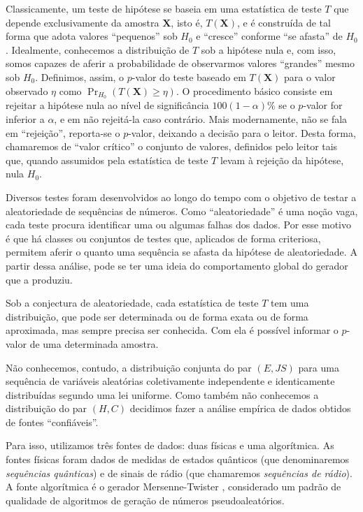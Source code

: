 Classicamente, um teste de hipótese se baseia em uma estatística de teste $T$ que depende exclusivamente da amostra $\bm X$, isto é, $T(\bm X)$, e é construída de tal forma que adota valores ``pequenos'' sob $H_0$ e ``cresce'' conforme ``se afasta'' de $H_0$.
Idealmente, conhecemos a distribuição de $T$ sob a hipótese nula e, com isso, somos capazes de aferir a probabilidade de observarmos valores ``grandes'' mesmo sob $H_0$.
Definimos, assim, o $p$-valor do teste baseado em $T(\bm X)$ para o valor observado $\eta$ como $\Pr_{H_0}(T(\bm X) \geq \eta)$.
O procedimento básico consiste em rejeitar a hipótese nula ao nível de significância $100(1-\alpha)\%$ se o $p$-valor for inferior a $\alpha$, e em não rejeitá-la caso contrário.
Mais modernamente, não se fala em ``rejeição'', reporta-se o $p$-valor, deixando a decisão para o leitor. Desta forma, chamaremos de ``valor crítico'' o conjunto de valores, definidos pelo leitor tais que, quando assumidos pela estatística de teste $T$ levam à rejeição da hipótese, nula $H_0$. 

Diversos testes foram desenvolvidos ao longo do tempo com o objetivo de testar a aleatoriedade de sequências de números.
Como ``aleatoriedade'' é uma noção vaga, cada teste procura identificar uma ou algumas falhas dos dados.
Por esse motivo é que há classes ou conjuntos de testes que, aplicados de forma criteriosa, permitem aferir o quanto uma sequência se afasta da hipótese de aleatoriedade.
A partir dessa análise, pode se ter uma ideia do comportamento global do gerador que a produziu.

Sob a conjectura de aleatoriedade, cada estatística de teste $T$ tem uma distribuição, que pode ser determinada ou de forma exata ou de forma aproximada, mas sempre precisa ser conhecida.
Com ela é possível informar o $p$-valor de uma determinada amostra.

Não conhecemos, contudo, a distribuição conjunta do par $(E,JS)$ para uma sequência de variáveis aleatórias coletivamente independente e identicamente distribuídas segundo uma lei uniforme.
Como também não conhecemos a distribuição do par $(H,C)$ decidimos fazer a análise empírica de dados obtidos de fontes ``confiáveis''.

Para isso, utilizamos três fontes de dados: duas físicas e uma algorítmica.
As fontes físicas foram dados de medidas de estados quânticos \citep{RNGVacuumStates} (que denominaremos \textit{sequências quânticas}) e de sinais de rádio \citep{RandomHostingAdvice} (que chamaremos \textit{sequências de rádio}).
A fonte algorítmica é o gerador Mersenne-Twister \citep{Matsumoto98}, considerado um padrão de qualidade de algoritmos de geração de números pseudoaleatórios.

